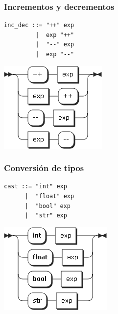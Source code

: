 \subsubsection{Incrementos y decrementos}
\begin{multicols}{2}
\begin{lstlisting}[style=nonumbers]      
inc_dec ::= "++" exp
         |  exp "++"
         |  "--" exp
         |  exp "--"
\end{lstlisting}  
\columnbreak	
\begin{center}
\includegraphics[scale=0.5]{diagram/inc_dec.png} \\
\end{center}
\end{multicols}
\pagebreak
\subsubsection{Conversión de tipos}
\begin{multicols}{2}
\begin{lstlisting}[style=nonumbers]      
cast ::= "int" exp
      |  "float" exp
      |  "bool" exp
      |  "str" exp
\end{lstlisting}  
\columnbreak	
\begin{center}
\includegraphics[scale=0.5]{diagram/cast.png} \\
\end{center}
\end{multicols}



